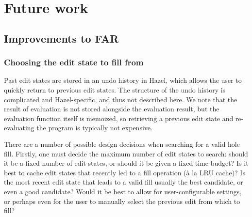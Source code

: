 \chapter{Future work}
\label{sec:future_work}

\section{Improvements to FAR}
\label{sec:far-improvements}



\subsection{Choosing the edit state to fill from}
\label{sec:far-past-edit-states}

Past edit states are stored in an undo history in Hazel, which allows the user to quickly return to previous edit states. The structure of the undo history is complicated and Hazel-specific, and thus not described here. We note that the result of evaluation is not stored alongside the evaluation result, but the evaluation function itself is memoized, so retrieving a previous edit state and re-evaluating the program is typically not expensive.


There are a number of possible design decisions when searching for a valid hole fill. Firstly, one must decide the maximum number of edit states to search: should it be a fixed number of edit states, or should it be given a fixed time budget? Is it best to cache edit states that recently led to a fill operation (\`a la LRU cache)? Is the most recent edit state that leads to a valid fill usually the best candidate, or even a good candidate? Would it be best to allow for user-configurable settings, or perhaps even for the user to manually select the previous edit from which to fill?


